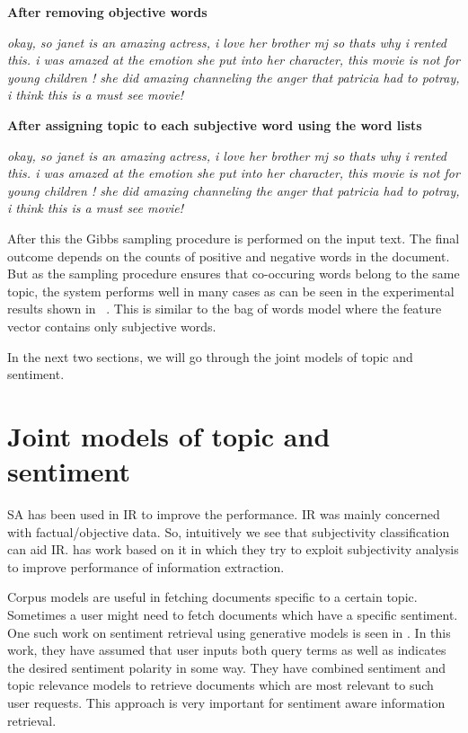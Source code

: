 \textbf{After removing objective words}

\textit{ {\color[rgb]{0.4,0.4,0.4}okay, so janet is an} amazing {\color[rgb]{0.4,0.4,0.4}actress, i} love {\color[rgb]{0.4,0.4,0.4}her brother mj so thats why i rented 
this. i was} amazed {\color[rgb]{0.4,0.4,0.4}at the emotion she put into her character, this movie is not for young children ! she did} amazing {\color[rgb]{0.4,0.4,0.4}channeling 
the} anger {\color[rgb]{0.4,0.4,0.4}that patricia had to potray, i think this is a must see movie! }}

\textbf{After assigning topic to each subjective word using the word lists}

\textit{ {\color[rgb]{0.4,0.4,0.4}okay, so janet is an} {\color{green}amazing} {\color[rgb]{0.4,0.4,0.4}actress, i} {\color{green}love} {\color[rgb]{0.4,0.4,0.4}her 
brother mj so thats why i rented this. i was} {\color{green}amazed} {\color[rgb]{0.4,0.4,0.4}at the emotion she put into her character, this movie is not for young 
children ! she did} {\color{green}amazing} {\color[rgb]{0.4,0.4,0.4}channeling the} {\color{red}anger} {\color[rgb]{0.4,0.4,0.4}that patricia had to potray, i think 
this is a must see movie! }}

After this the Gibbs sampling procedure is performed on the input text. The final outcome depends on the counts of positive and negative words in the document. But as the 
sampling procedure ensures that co-occuring words belong to the same topic, the system performs well in many cases as can be seen in the experimental results shown in
~. This is similar to the bag of words model where the feature vector contains only subjective words.

In the next two sections, we will go through the joint models of topic and sentiment.

\section{Joint models of topic and sentiment}

SA has been used in IR to improve the performance. IR was mainly concerned with factual/objective data. So, intuitively we see that subjectivity classification 
can aid IR. \citep*{riloff2005exploiting} has work based on it in which they try to exploit subjectivity analysis to improve performance of information extraction. 

Corpus models are useful in fetching documents specific to a certain topic. Sometimes a user might need to fetch documents which have a specific sentiment. One 
such work on sentiment retrieval using generative models is seen in \citep*{eguchi2006sentiment}. In this work, they have assumed that user inputs both query 
terms as well as indicates the desired sentiment polarity in some way. They have combined sentiment and topic relevance models to retrieve documents which are most
relevant to such user requests. This approach is very important for sentiment aware information retrieval.

